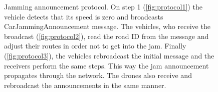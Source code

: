 \documentclass[]{nsm-thesis}
\begin{document}
\begin{figure}%
	\centering
	\hfill
	\hfill
	\caption{Jamming announcement protocol. On step 1 (\cref{fig:protocol1}) the vehicle detects that its speed is zero and broadcasts CarJammingAnnouncement message. The vehicles, who receive the broadcast (\cref{fig:protocol2}), read the road ID from the message and adjust their routes in order not to get into the jam. Finally (\cref{fig:protocol3}), the vehicles rebroadcast the initial message and the receivers perform the same steps. This way the jam announcement propagates through the network. The drones also receive and rebroadcast the announcements in the same manner.}%
	\label{fig:protocol}%
\end{figure}
\end{document}
